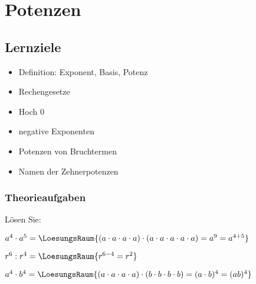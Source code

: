 
\section{Potenzen}


\subsection*{Lernziele}

\begin{itemize}
\item Definition: Exponent, Basis, Potenz
\item Rechengesetze
\item Hoch 0
\item negative Exponenten
\item Potenzen von Bruchtermen
\item Namen der Zehnerpotenzen
\end{itemize}
\newpage



\newpage





\subsubsection{Theorieaufgaben}

Lösen Sie:


 $a^4\cdot a^5 =\LoesungsRaum{(a\cdot a\cdot a\cdot a) \cdot (a\cdot a\cdot a\cdot a\cdot a) = a^9 = a^{4+5}}$

 $r^6 : r^4 =\LoesungsRaum{r^{6-4}=r^2}$

 $a^4\cdot b^4 =\LoesungsRaum{(a\cdot a\cdot a\cdot a) \cdot (b\cdot b\cdot b\cdot b) = (a\cdot{}b)^4 = (ab)^4}$

